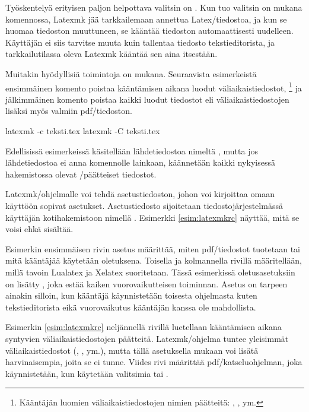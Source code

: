 Työskentelyä erityisen paljon helpottava valitsin on . Kun
tuo valitsin on mukana komennossa, Latexmk jää tarkkailemaan annettua
Latex\-/tiedostoa, ja kun se huomaa tiedoston muuttuneen, se kääntää
tiedoston automaattisesti uudelleen. Käyttäjän ei siis tarvitse muuta
kuin tallentaa tiedosto tekstieditorista, ja tarkkailutilassa oleva
Latexmk kääntää sen aina itsestään.

Muitakin hyödyllisiä toimintoja on mukana. Seuraavista esimerkeistä
ensimmäinen komento poistaa kääntämisen aikana luodut
väliaikaistiedostot,%
\footnote{Kääntäjän luomien väliaikaistiedostojen nimien päätteitä:
  , ,  ym.} ja jälkimmäinen komento
poistaa kaikki luodut tiedostot eli väliaikaistiedostojen lisäksi myös
valmiin pdf\-/tiedoston.

\begin{koodilohkosis}
  latexmk -c teksti.tex
  latexmk -C teksti.tex
\end{koodilohkosis}

Edellisissä esimerkeissä käsitellään lähdetiedostoa nimeltä
, mutta jos lähdetiedostoa ei anna komennolle
lainkaan, käännetään kaikki nykyisessä hakemistossa olevat
\-/päätteiset tiedostot.

Latexmk\-/ohjelmalle voi tehdä asetustiedoston, johon voi kirjoittaa
omaan käyttöön sopivat asetukset. Asetustiedosto sijoitetaan
tiedostojärjestelmässä käyttäjän kotihakemistoon nimellä
. Esimerkki \ref{esim:latexmkrc} näyttää, mitä se
voisi ehkä sisältää.

Esimerkin ensimmäisen rivin asetus määrittää, miten pdf\-/tiedostot
tuotetaan tai mitä kääntäjää käytetään oletuksena. Toisella ja
kolmannella rivillä määritellään, millä tavoin Lualatex ja Xelatex
suoritetaan. Tässä esimerkissä oletusasetuksiin on lisätty
, joka estää kaiken vuorovaikutteisen toiminnan.
Asetus on tarpeen ainakin silloin, kun kääntäjä käynnistetään toisesta
ohjelmasta kuten tekstieditorista eikä vuorovaikutus kääntäjän kanssa
ole mahdollista.



Esimerkin \ref{esim:latexmkrc} neljännellä rivillä luetellaan
kääntämisen aikana syntyvien väliaikaistiedostojen päätteitä.
Latexmk\-/ohjelma tuntee yleisimmät väliaikaistiedostot (,
,  ym.), mutta tällä asetuksella mukaan voi lisätä
harvinaisempia, joita se ei tunne. Viides rivi määrittää
pdf\-/katseluohjelman, joka käynnistetään, kun käytetään valitsimia
 tai .

